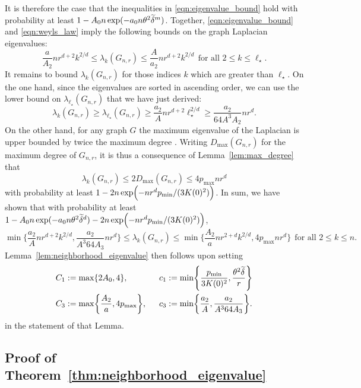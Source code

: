 It is therefore the case that the inequalities in \eqref{eqn:eigenvalue_bound} hold with probability at least $1 - A_0n\exp(-a_0n\theta^2\widetilde{\delta}^{m})$. Together, \eqref{eqn:eigenvalue_bound} and \eqref{eqn:weyls_law} imply the following bounds on the graph Laplacian eigenvalues:
\begin{equation*}
\frac{a}{A_2} nr^{d + 2} k^{2/d} \leq \lambda_k(G_{n,r}) \leq \frac{A}{a_2} nr^{d + 2} k^{2/d}~~\textrm{for all $2 \leq k \leq \ell_{\star}$}.
\end{equation*}
It remains to bound $\lambda_k(G_{n,r})$ for those indices $k$ which are greater than $\ell_{\star}$. On the one hand, since the eigenvalues are sorted in ascending order, we can use the lower bound on $\lambda_{\ell_{\star}}(G_{n,r})$ that we have just derived:
\begin{equation*}
\lambda_k(G_{n,r}) \geq \lambda_{\ell_{\star}}(G_{n,r}) \geq \frac{a_2}{A}nr^{d + 2}\ell_{\star}^{2/d} \geq \frac{a_2}{64A^3 A_2} nr^{d}.
\end{equation*}
On the other hand, for any graph $G$ the maximum eigenvalue of the Laplacian is upper bounded by twice the maximum degree \citep{chung97}. Writing $D_{\max}(G_{n,r})$ for the maximum degree of $G_{n,r}$, it is thus a consequence of Lemma~\ref{lem:max_degree} that
\begin{equation*}
\lambda_k(G_{n,r}) \leq 2D_{\max}(G_{n,r}) \leq 4p_{\max}nr^d 
\end{equation*}
with probability at least $1 - 2n\exp\Bigl(-nr^dp_{\min}/(3K(0)^2)\Bigr)$. In sum, we have shown that with probability at least $1 - A_0n\exp(-a_0n\theta^2\widetilde{\delta}^{d}) - 2n\exp\Bigl(-nr^dp_{\min}/(3K(0)^2)\Bigr)$,
\begin{equation*}
\min\biggl\{\frac{a_2}{A}nr^{d + 2}k^{2/d}, \frac{a_2}{A^3 64 A_3} nr^d\biggr\} \leq \lambda_k(G_{n,r}) \leq \min\biggl\{\frac{A_2}{a}nr^{2 + d}k^{2/d}, 4p_{\max}nr^d\biggr\}~~\textrm{for all $2 \leq k \leq n$.}
\end{equation*}
Lemma~\ref{lem:neighborhood_eigenvalue} then follows upon setting
\begin{align*}
C_1 & := \max\{2A_0,4\},~~ && c_1 := \min\Biggl\{\frac{p_{\min}}{3K(0)^2}, \frac{\theta^2\widetilde{\delta}}{r}\Biggr\} \\
C_3 & := \max\biggl\{\frac{A_2}{a}, 4p_{\max}\biggr\},~~ && c_3 := \min\biggl\{\frac{a_2}{A}, \frac{a_2}{A^3 64 A_3} \biggr\}.
\end{align*}
in the statement of that Lemma.

\subsection{Proof of Theorem~\ref{thm:neighborhood_eigenvalue}}

